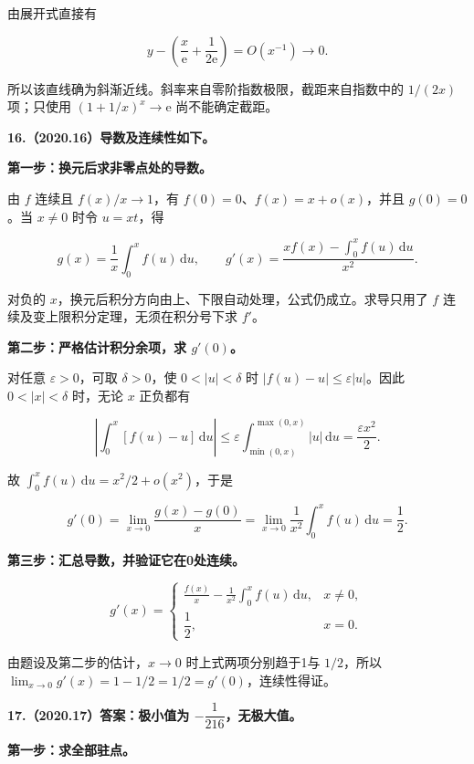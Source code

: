 \documentclass[UTF8,11pt,fontset=windows]{ctexart}
\begin{document}
由展开式直接有

$$
y-\left(\frac{x}{\mathrm e}+\frac1{2\mathrm e}\right)
=O(x^{-1})\longrightarrow0.
$$

所以该直线确为斜渐近线。斜率来自零阶指数极限，截距来自指数中的 $1/(2x)$ 项；只使用 $(1+1/x)^x\to\mathrm e$ 尚不能确定截距。

\clearpage

\textbf{16.（2020.16）导数及连续性如下。}

\textbf{第一步：换元后求非零点处的导数。}

由 $f$ 连续且 $f(x)/x\to1$，有 $f(0)=0$、$f(x)=x+o(x)$，并且 $g(0)=0$。当 $x\ne0$ 时令 $u=xt$，得

$$
g(x)=\frac1x\int_0^x f(u)\,\mathrm du,
\qquad
g'(x)=\frac{x f(x)-\int_0^x f(u)\,\mathrm du}{x^2}.
$$

对负的 $x$，换元后积分方向由上、下限自动处理，公式仍成立。求导只用了 $f$ 连续及变上限积分定理，无须在积分号下求 $f'$。

\textbf{第二步：严格估计积分余项，求 $g'(0)$。}

对任意 $\varepsilon>0$，可取 $\delta>0$，使 $0<|u|<\delta$ 时 $|f(u)-u|\le\varepsilon|u|$。因此 $0<|x|<\delta$ 时，无论 $x$ 正负都有

$$
\left|\int_0^x[f(u)-u]\,\mathrm du\right|
\le\varepsilon\int_{\min(0,x)}^{\max(0,x)}|u|\,\mathrm du
=\frac{\varepsilon x^2}{2}.
$$

故 $\int_0^x f(u)\,\mathrm du=x^2/2+o(x^2)$，于是

$$
g'(0)=\lim_{x\to0}\frac{g(x)-g(0)}x
=\lim_{x\to0}\frac1{x^2}\int_0^x f(u)\,\mathrm du=\frac12.
$$

\textbf{第三步：汇总导数，并验证它在0处连续。}

$$
\boxed{g'(x)=\begin{cases}
\displaystyle\frac{f(x)}x-\frac1{x^2}\int_0^x f(u)\,\mathrm du,&x\ne0,\\[6pt]
\dfrac12,&x=0.
\end{cases}}
$$

由题设及第二步的估计，$x\to0$ 时上式两项分别趋于1与 $1/2$，所以 $\lim_{x\to0}g'(x)=1-1/2=1/2=g'(0)$，连续性得证。

\clearpage

\textbf{17.（2020.17）答案：极小值为 $-\dfrac1{216}$，无极大值。}

\textbf{第一步：求全部驻点。}
\end{document}
